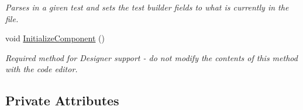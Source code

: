 \begin{DoxyCompactItemize}
\begin{DoxyCompactList}\small\item\em Parses in a given test and sets the test builder fields to what is currently in the file. \end{DoxyCompactList}\item 
void \mbox{\hyperlink{class_cert_complete_1_1_test___creation___form_a8cd97d64b7880238ad19aa90bbda443a}{Initialize\+Component}} ()
\begin{DoxyCompactList}\small\item\em Required method for Designer support -\/ do not modify the contents of this method with the code editor. \end{DoxyCompactList}\end{DoxyCompactItemize}
\subsection*{Private Attributes}
